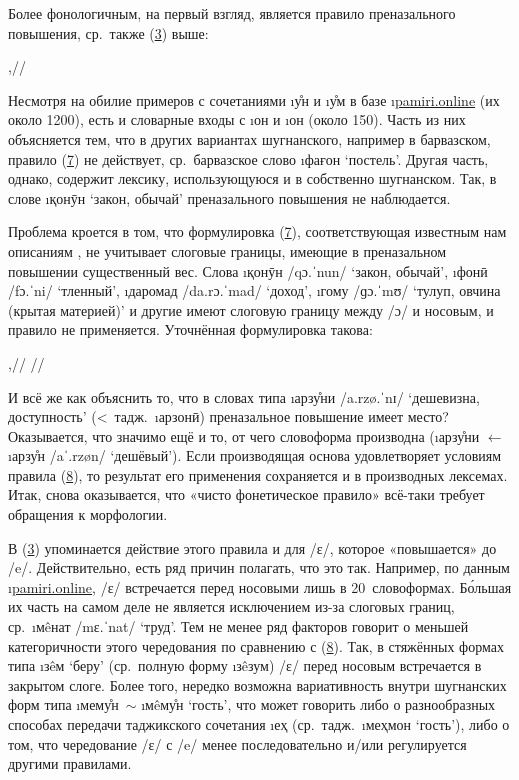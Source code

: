 Более фонологичным, на первый взгляд, является правило преназального повышения, ср.~также (\hyperref[exmorphon3]{3}) выше:

\ex[exno=7] \begingl[everygla=] \label{exmorphon7}
\gla {},//
\endgl \xe

Несмотря на обилие примеров с сочетаниями \i{у̊н} и \i{у̊м} в базе \i{\href{https://pamiri.online}{pamiri.online}} (их около 1200), есть и словарные входы с \i{он} и \i{он} (около 150). Часть из них объясняется тем, что в других вариантах шугнанского, например в барвазском, правило (\hyperref[exmorphon7]{7}) не действует, ср.~барвазское слово \i{фағон} ‘постель’. Другая часть, однако, содержит лексику, использующуюся и в собственно шугнанском. Так, в слове \i{қонӯн} ‘закон, обычай’ преназального повышения не наблюдается.

Проблема кроется в том, что формулировка (\hyperref[exmorphon7]{7}), соответствующая известным нам описаниям \parencites{sokolova1953}{edelman_yusufbekov1999_shughni}{edelman_dodykhudoeva2009_shughni}{olson2017}, не учитывает слоговые границы, имеющие в преназальном повышении существенный вес. Слова \i{қонӯн} /qɔ.ˈnun/ ‘закон, обычай’, \i{фонӣ} /fɔ.ˈni/ ‘тленный’, \i{даромад} /da.rɔ.ˈmad/ ‘доход’, \i{гому} /ɡɔ.ˈmʊ/ ‘тулуп, овчина (крытая материей)’ и другие имеют слоговую границу между /ɔ/ и носовым, и правило не применяется. Уточнённая формулировка такова:

\ex[exno=8] \begingl[everygla=] \label{exmorphon8}
\gla {},//
//
\endgl \xe

И всё же как объяснить то, что в словах типа \i{арзу̊ни} /a.rzø.ˈnɪ/ ‘дешевизна, доступность’ (<~тадж.~\i{арзонӣ}) преназальное повышение имеет место? Оказывается, что значимо ещё и то, от чего словоформа производна (\i{арзу̊ни} $\leftarrow$ \i{арзу̊н} /aˈ.rzøn/ ‘дешёвый’). Если производящая основа удовлетворяет условиям правила (\hyperref[exmorphon8]{8}), то результат его применения сохраняется и в производных лексемах. Итак, снова оказывается, что «чисто фонетическое правило» всё-таки требует обращения к морфологии.

В (\hyperref[exmorphon3]{3}) упоминается действие этого правила и для /ɛ/, которое «повышается» до /e/. Действительно, есть ряд причин полагать, что это так. Например, по данным \i{\href{https://pamiri.online}{pamiri.online}}, /ɛ/ встречается перед носовыми лишь в 20~словоформах. Бо́льшая их часть на самом деле не является исключением из-за слоговых границ, ср.~\i{мêнат} /mɛ.ˈnat/ ‘труд’. Тем не менее ряд факторов говорит о меньшей категоричности этого чередования по сравнению с (\hyperref[exmorphon8]{8}). Так, в стяжённых формах типа \i{зêм} ‘беру’ (ср.~полную форму \i{зêзум}) /ɛ/ перед носовым встречается в закрытом слоге. Более того, нередко возможна вариативность внутри шугнанских форм типа \i{мему̊н}~$\sim$ \i{мêму̊н} ‘гость’, что может говорить либо о разнообразных способах передачи таджикского сочетания \i{еҳ} (ср.~тадж.~\i{меҳмон} ‘гость’), либо о том, что чередование /ɛ/ с /e/ менее последовательно и/или регулируется другими правилами.

